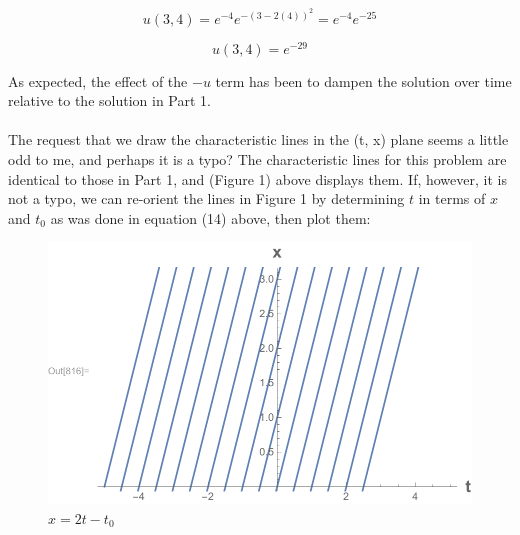 \documentclass{article}
\begin{document}
\begin{equation}
u(3, 4) = e^{-4}e^{-(3-2(4))^2}= e^{-4}e^{-25}
\end{equation}
\begin{tcolorbox}[minipage,colback=white,arc=0pt,outer arc=0pt]
\begin{equation}
u(3,4) = e^{-29}
\end{equation}
\end{tcolorbox}
As expected, the effect of the $-u$ term has been to dampen the solution over time relative to the solution in Part 1.\\
\\
The request that we draw the characteristic lines in the (t, x) plane seems a little odd to me, and perhaps it is a typo? The characteristic lines for this problem are identical to those in Part 1, and (Figure 1) above displays them. If, however, it is not a typo, we can re-orient the lines in Figure 1 by determining $t$ in terms of $x$ and $t_0$ as was done in equation (14) above, then plot them:
\begin{figure}[H]
  \centering
    \includegraphics[width=\textwidth]{hw_12_plot3.pdf}
    \caption{$x = 2t - t_0$}
\end{figure}
\end{document}
